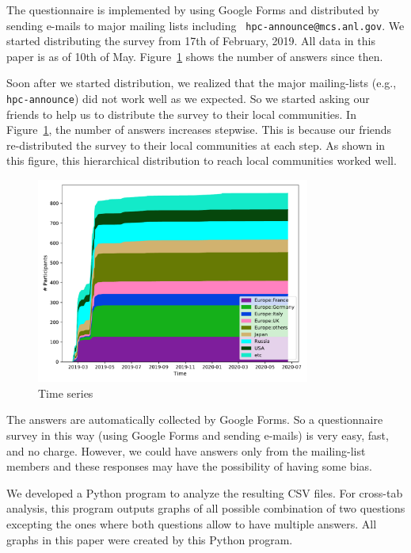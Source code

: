 \documentclass[submit,techrep,noauthor,english]{ipsj}
\begin{document}
The questionnaire is implemented by using Google Forms and distributed
by sending e-mails to major mailing lists including {\tt
  hpc-announce@mcs.anl.gov}. We started distributing the survey from 17th of
February, 2019. All data in this paper is as of 10th of
May. Figure~\ref{fig:timeseries} shows the number of answers since then.

Soon after we started distribution, we realized that the major
mailing-lists (e.g., {\tt hpc-announce}) did not work well as we
expected. So we started asking our friends to help us to distribute
the survey to their local communities. In Figure~\ref{fig:timeseries},
the number of answers increases stepwise. This is because our friends
re-distributed the survey to their local communities at each step. As
shown in this figure, this hierarchical distribution to reach local
communities worked well.

\begin{figure}[htb]
\begin{center}
\includegraphics[width=9cm]{../pdfs/TimeSeries.pdf}
\caption{Time series}
\label{fig:timeseries}
\end{center}
\end{figure}

The answers are automatically collected by Google Forms. So a
questionnaire survey in this way (using Google Forms and sending
e-mails) is very easy, fast, and no charge.  However, we could have 
answers only from the mailing-list members and these responses may
have the possibility of having some bias.

We developed a Python program to analyze the resulting CSV files. For
cross-tab analysis, this program outputs graphs of all possible
combination of two questions excepting the ones where both questions
allow to have multiple answers. All graphs in this paper were created
by this Python program. 
\end{document}
